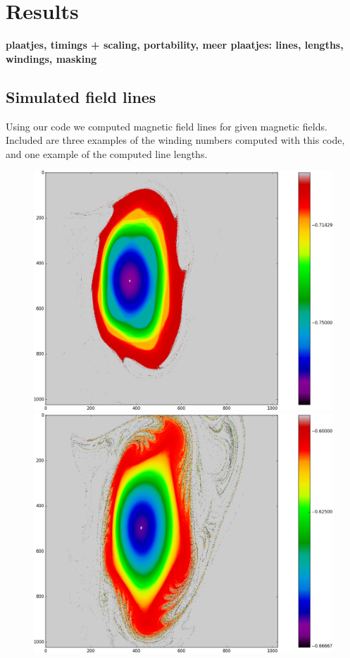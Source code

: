 \documentclass{article}
\begin{document}
\section{Results}
{\bf plaatjes, timings + scaling, portability, meer plaatjes: lines, lengths, windings, masking}
\subsection{Simulated field lines}
Using our code we computed magnetic field lines for given magnetic fields. Included are three examples of the winding numbers computed with this code, and one example of the computed line lengths.


\begin{figure}[!htb]
  \includegraphics[width=\linewidth]{Figures/Rings_Papertwist_twist1_82_steps32k.png}
\endminipage\hfill
{}%
  \includegraphics[width=\linewidth]{Figures/Rings_Papertwist_twist1_125_steps32k.png}

\end{figure}
\end{document}
